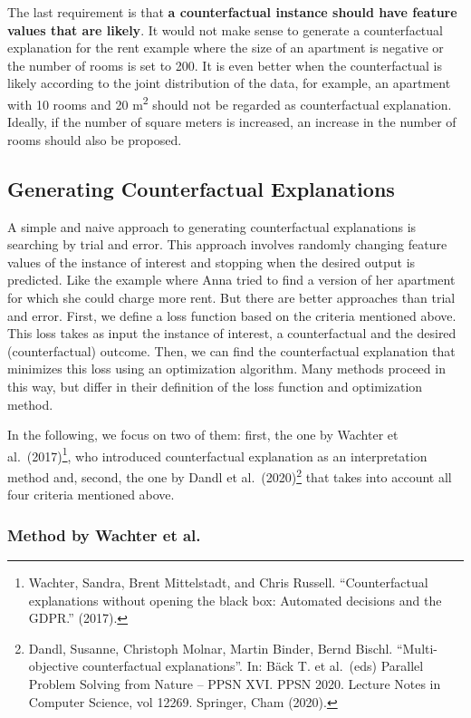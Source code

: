 \documentclass[
  11pt,
]{scrbook}
\begin{document}
The last requirement is that \textbf{a counterfactual instance should have feature values that are likely}.
It would not make sense to generate a counterfactual explanation for the rent example where the size of an apartment is negative or the number of rooms is set to 200.
It is even better when the counterfactual is likely according to the joint distribution of the data, for example, an apartment with 10 rooms and 20 m\textsuperscript{2} should not be regarded as counterfactual explanation.
Ideally, if the number of square meters is increased, an increase in the number of rooms should also be proposed.

\hypertarget{generating-counterfactual-explanations}{%
\subsection{Generating Counterfactual Explanations}\label{generating-counterfactual-explanations}}

A simple and naive approach to generating counterfactual explanations is searching by trial and error.
This approach involves randomly changing feature values of the instance of interest and stopping when the desired output is predicted.
Like the example where Anna tried to find a version of her apartment for which she could charge more rent.
But there are better approaches than trial and error.
First, we define a loss function based on the criteria mentioned above.
This loss takes as input the instance of interest, a counterfactual and the desired (counterfactual) outcome.
Then, we can find the counterfactual explanation that minimizes this loss using an optimization algorithm.
Many methods proceed in this way, but differ in their definition of the loss function and optimization method.

In the following, we focus on two of them: first, the one by Wachter et al.~(2017)\footnote{Wachter, Sandra, Brent Mittelstadt, and Chris Russell. ``Counterfactual explanations without opening the black box: Automated decisions and the GDPR.'' (2017).}, who introduced counterfactual explanation as an interpretation method and, second, the one by Dandl et al.~(2020)\footnote{Dandl, Susanne, Christoph Molnar, Martin Binder, Bernd Bischl. ``Multi-objective counterfactual explanations''. In: Bäck T. et al.~(eds) Parallel Problem Solving from Nature -- PPSN XVI. PPSN 2020. Lecture Notes in Computer Science, vol 12269. Springer, Cham (2020).} that takes into account all four criteria mentioned above.

\hypertarget{method-by-wachter-et-al.}{%
\subsubsection{Method by Wachter et al.~}\label{method-by-wachter-et-al.}}
\end{document}
